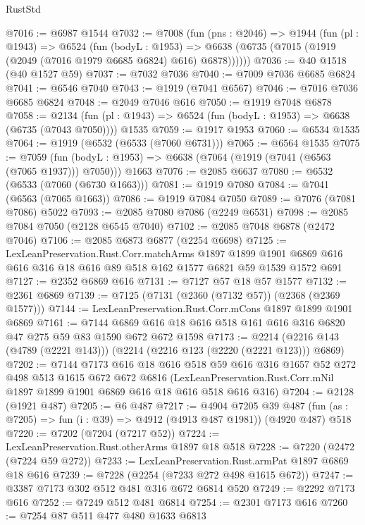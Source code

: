 \begin{lexlean}{RustStd}
\begin{coremodule}
@7016 := @6987 @1544
@7032 := @7008
    (fun (pns : @2046) =>
    @1944
      (fun (pl : @1943) =>
      @6524
        (fun (bodyL : @1953) =>
        @6638 (@6735 (@7015 (@1919 (@2049 (@7016 @1979 @6685 @6824) @616) @6878))))))
@7036 := @40 @1518 (@40 @1527 @59)
@7037 := @7032 @7036
@7040 := @7009 @7036 @6685 @6824
@7041 := @6546 @7040
@7043 := @1919 (@7041 @6567)
@7046 := @7016 @7036 @6685 @6824
@7048 := @2049 @7046 @616
@7050 := @1919 @7048 @6878
@7058 := @2134
    (fun (pl : @1943) => @6524 (fun (bodyL : @1953) => @6638 (@6735 (@7043 @7050))))
    @1535
@7059 := @1917 @1953
@7060 := @6534 @1535
@7064 := @1919 (@6532 (@6533 (@7060 @6731)))
@7065 := @6564 @1535
@7075 := @7059
    (fun (bodyL : @1953) => @6638 (@7064 (@1919 (@7041 (@6563 (@7065 @1937))) @7050)))
    @1663
@7076 := @2085 @6637
@7080 := @6532 (@6533 (@7060 (@6730 @1663)))
@7081 := @1919 @7080
@7084 := @7041 (@6563 (@7065 @1663))
@7086 := @1919 @7084 @7050
@7089 := @7076 (@7081 @7086) @5022
@7093 := @2085 @7080 @7086 (@2249 @6531)
@7098 := @2085 @7084 @7050 (@2128 @6545 @7040)
@7102 := @2085 @7048 @6878 (@2472 @7046)
@7106 := @2085 @6873 @6877 (@2254 @6698)
@7125 := LexLeanPreservation.Rust.Corr.matchArms
    @1897
    @1899
    @1901
    @6869
    @616
    @616
    @316
    @18
    @616
    @89
    @518
    @162
    @1577
    @6821
    @59
    @1539
    @1572
    @691
@7127 := @2352 @6869 @616
@7131 := @7127 @57 @18 @57 @1577
@7132 := @2361 @6869
@7139 := @7125 (@7131 (@2360 (@7132 @57)) (@2368 (@2369 @1577)))
@7144 := LexLeanPreservation.Rust.Corr.mCons @1897 @1899 @1901 @6869
@7161 := @7144 @6869 @616 @18 @616 @518 @161 @616 @316 @6820 @47 @275 @59 @83 @1590 @672 @672 @1598
@7173 := @2214 (@2216 @143 (@4789 (@2221 @143))) (@2214 (@2216 @123 (@2220 (@2221 @123))) @6869)
@7202 := @7144
    @7173
    @616
    @18
    @616
    @518
    @59
    @616
    @316
    @1657
    @52
    @272
    @498
    @513
    @1615
    @672
    @672
    @6816
    (LexLeanPreservation.Rust.Corr.mNil @1897 @1899 @1901 @6869 @616 @18 @616 @518 @616 @316)
@7204 := @2128 (@1921 @487)
@7205 := @6 @487
@7217 := @4904
    @7205
    @39
    @487
    (fun (as : @7205) => fun (i : @39) => @4912 (@4913 @487 @1981))
    (@4920 @487)
    @518
@7220 := @7202 (@7204 (@7217 @52))
@7224 := LexLeanPreservation.Rust.otherArms @1897 @18 @518
@7228 := @7220 (@2472 (@7224 @59 @272))
@7233 := LexLeanPreservation.Rust.armPat @1897 @6869 @18 @616
@7239 := @7228 (@2254 (@7233 @272 @498 @1615 @672))
@7247 := @3387 @7173 @302 @512 @481 @316 @672 @6814 @520
@7249 := @2292 @7173 @616
@7252 := @7249 @512 @481 @6814
@7254 := @2301 @7173 @616
@7260 := @7254 @87 @511 @477 @480 @1633 @6813

\end{coremodule}
\end{lexlean}
